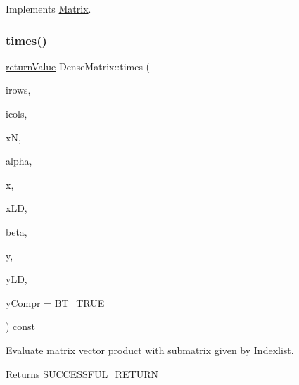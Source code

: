 Implements \hyperlink{class_matrix_a329b638ce6ce41715b156766646b3fcc}{Matrix}.

\mbox{\label{class_dense_matrix_a9c28fb04f559bd91842081460b8cbbb1}} 
\subsubsection{\texorpdfstring{times()}{times()}\hspace{0.1cm}{\footnotesize\ttfamily [2/2]}}
{\footnotesize\ttfamily \hyperlink{_message_handling_8hpp_a81d556f613bfbabd0b1f9488c0fa865e}{return\+Value} Dense\+Matrix\+::times (\begin{DoxyParamCaption}\item[{const \hyperlink{class_indexlist}{Indexlist} $\ast$const}]{irows,  }\item[{const \hyperlink{class_indexlist}{Indexlist} $\ast$const}]{icols,  }\item[{\hyperlink{_types_8hpp_ab6fd6105e64ed14a0c9281326f05e623}{int\+\_\+t}}]{xN,  }\item[{\hyperlink{qp_o_a_s_e_s__wrapper_8h_a0d00e2b3dfadee81331bbb39068570c4}{real\+\_\+t}}]{alpha,  }\item[{const \hyperlink{qp_o_a_s_e_s__wrapper_8h_a0d00e2b3dfadee81331bbb39068570c4}{real\+\_\+t} $\ast$}]{x,  }\item[{\hyperlink{_types_8hpp_ab6fd6105e64ed14a0c9281326f05e623}{int\+\_\+t}}]{x\+LD,  }\item[{\hyperlink{qp_o_a_s_e_s__wrapper_8h_a0d00e2b3dfadee81331bbb39068570c4}{real\+\_\+t}}]{beta,  }\item[{\hyperlink{qp_o_a_s_e_s__wrapper_8h_a0d00e2b3dfadee81331bbb39068570c4}{real\+\_\+t} $\ast$}]{y,  }\item[{\hyperlink{_types_8hpp_ab6fd6105e64ed14a0c9281326f05e623}{int\+\_\+t}}]{y\+LD,  }\item[{\hyperlink{_types_8hpp_a20f82124c82b6f5686a7fce454ef9089}{Boolean\+Type}}]{y\+Compr = {\ttfamily \hyperlink{_types_8hpp_a20f82124c82b6f5686a7fce454ef9089a34c57965bfb07125b09326a69019f9c6}{B\+T\+\_\+\+T\+R\+UE}} }\end{DoxyParamCaption}) const\hspace{0.3cm}{\ttfamily [virtual]}}

Evaluate matrix vector product with submatrix given by \hyperlink{class_indexlist}{Indexlist}. \begin{DoxyReturn}{Returns}
S\+U\+C\+C\+E\+S\+S\+F\+U\+L\+\_\+\+R\+E\+T\+U\+RN 
\end{DoxyReturn}

